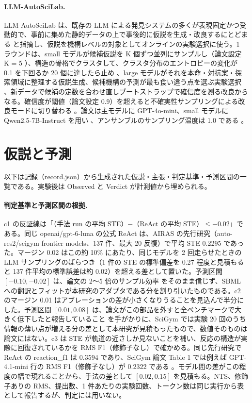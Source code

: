 \documentclass{article}
\providecommand{\unverified}[1]{#1}
\begin{document}
\paragraph{LLM-AutoSciLab.}
LLM-AutoSciLab \citep{kabra-2026-llm} は、既存の LLM による発見システムの多くが表現固定かつ受動的で、事前に集めた静的データの上で事後的に仮説を生成・改良するにとどまる \cite[s2.p3]{kabra-2026-llm} と指摘し、仮説を機構レベルの対象としてオンラインの実験選択に使う。1 ラウンドは、small モデルが候補仮説を K 個ずつ並列にサンプルし（論文設定 K = 5 \cite[s2.p9]{kabra-2026-llm}）、構造の骨格でクラスタして、クラスタ分布のエントロピーの変化が 0.1 を下回るか 20 個に達したら止め \cite[s2.p10]{kabra-2026-llm}、large モデルがそれを本命・対抗案・探索領域に整理する仮説生成、候補機構の予測が最も食い違う点を選ぶ実験選択 \cite[s2.p6]{kabra-2026-llm}、新データで候補の定数を合わせ直しブートストラップで確信度を測る改良からなる。確信度が閾値（論文設定 0.9）を超えると不確実性サンプリングによる改良モードに切り替わる \cite[s2.p12]{kabra-2026-llm}。論文は主モデルに GPT-4o-mini、small モデルに Qwen2.5-7B-Instruct を用い \cite[s2.p4]{kabra-2026-llm}、アンサンブルのサンプリング温度は 1.0 である \cite[s2.p13]{kabra-2026-llm}。

\section{仮説と予測}
\label{sec:hypothesis}
以下は記録（record.json）から生成された仮説・主張・判定基準・予測区間の一覧である。実験後は Observed と Verdict が計測値から埋められる。



\paragraph{判定基準と予測区間の根拠.}
c1 の反証線は「（手法 run の平均 STE）$-$（ReAct の平均 STE）$\le -0.02$」である。同じ openai/gpt-6-luna の公式 ReAct は、AIRAS の先行研究（auto-res2/scigym-frontier-models、137 件、最大 20 反復）で平均 STE \unverified{0.2295} であった。マージン 0.02 はこの約 10\% にあたり、同じモデルを 2 回走らせたときの LLM サンプリングのばらつき（1 件の STE の標準偏差を 0.27 程度と見積もると 137 件平均の標準誤差は約 0.02）を超える差として置いた。予測区間 $[-0.10, -0.02]$ は、論文の 2〜5 倍のサンプル効率 \cite[s2.p1]{kabra-2026-llm} をそのまま信じず、SBML への翻訳とフィットが本研究のアダプタである分を割り引いたものである。c2 のマージン 0.01 はアブレーションの差が小さくなりうることを見込んで半分にした。予測区間 $[0.01, 0.08]$ は、論文がこの部品を外すと全ベンチマークで大きく低下したと報告していること \cite[s2.p7]{kabra-2026-llm} を手がかりに、SciGym では実験 20 回のうち情報の薄い点が増える分の差として本研究が見積もったもので、数値そのものは論文にはない。c3 は STE が軌道の近さしか見ないことを補い、反応の構造が実際に回復されているかを RMS F1（修飾子なし）で確かめる。同じ先行研究で ReAct の reaction\_f1 は \unverified{0.3594} であり、SciGym 論文 Table 1 では例えば GPT-4.1-mini 行の RMS F1（修飾子なし）が \unverified{0.2322} である \cite[s1.p10]{duan-2025-measuring}。モデル間の差がこの程度の幅で現れることから、手法の差として $[0.02, 0.15]$ を見積もる。NTS、修飾子ありの RMS、提出数、1 件あたりの実験回数、トークン数は同じ実行から表として報告するが、判定には用いない。
\end{document}
